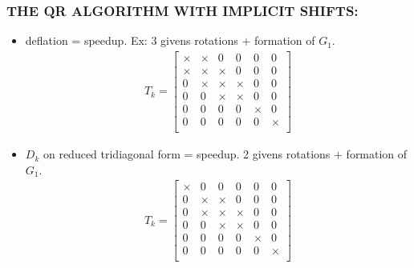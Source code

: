 \documentclass[a4paper,8pt]{beamer} %
\newcommand{\smatrix}[1]{\left[\begin{matrix} #1 \end{matrix}\right]}
\begin{document}
\begin{frame} %
\frametitle{THE QR ALGORITHM WITH IMPLICIT SHIFTS:} 
\begin{itemize}
	\item deflation = speedup. Ex: 3 givens rotations $+$ formation of $G_1$.
		\begin{align}
			T_k = \smatrix{
				\times & \times & 		0 	& 0 & 0 & 0 \\
				\times & \times & \times 	& 0 & 0 & 0 \\
				0 & \times & \times	& \times 	& 0 & 0 \\
				0 &  0 & \times	& \times 		& 0 & 0 \\
				0 &  0 & 0	& 0 	& \times & 0 \\
				0 &  0 & 0	& 0 	& 0 & \times \\
			}
		\end{align}
	\item $D_k$ on reduced tridiagonal form = speedup. 2 givens rotations $+$ formation of $G_1$.
		\begin{align}
			T_k = \smatrix{
				\times & 0 & 		0 	& 0 & 0 & 0 \\
				0 & \times & \times 	& 0 & 0 & 0 \\
				0 & \times & \times	& \times 	& 0 & 0 \\
				0 &  0 & \times	& \times 		& 0 & 0 \\
				0 &  0 & 0	& 0 	& \times & 0 \\
				0 &  0 & 0	& 0 	& 0 & \times \\
			}
		\end{align}
\end{itemize}
\end{frame}%
\end{document}
